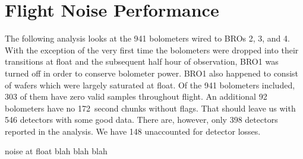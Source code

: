 

\section{Flight Noise Performance}
\label{flight_noise_performance}

The following analysis looks at the 941 bolometers wired to \ac{BRO}s 2, 3, and 4. 
With the exception of the very first time the bolometers were dropped into their transitions at float and the subsequent half hour of observation, \ac{BRO}1 was turned off in order to conserve bolometer power. \ac{BRO}1 also happened to consist of wafers which were largely saturated at float. 
Of the 941 bolometers included, 303 of them have zero valid samples throughout flight. 
An additional 92 bolometers have no 172~second chunks without flags. 
That should leave us with 546 detectors with some good data. 
There are, however, only 398 detectors reported in the analysis. 
We have 148 unaccounted for detector losses. 



noise at float blah blah blah

